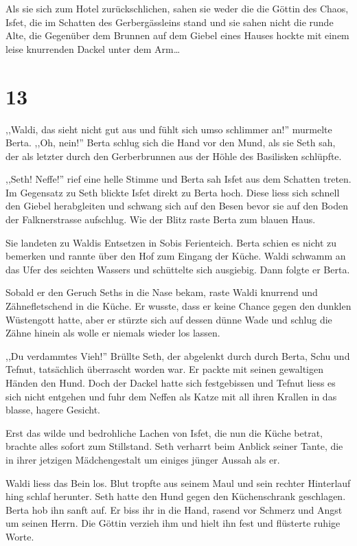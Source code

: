 Als sie sich zum Hotel zurückschlichen, sahen sie weder die die Göttin des Chaos, Isfet, die im Schatten des Gerbergässleins stand und sie sahen nicht die runde Alte, die Gegenüber dem Brunnen auf dem Giebel eines Hauses hockte mit einem leise knurrenden Dackel unter dem Arm\dots

\section*{13}

,,Waldi, das sieht nicht gut aus und fühlt sich umso schlimmer an!'' murmelte Berta. ,,Oh, nein!'' Berta schlug sich die Hand vor den Mund, als sie Seth sah, der als letzter durch den Gerberbrunnen aus der Höhle des Basilisken schlüpfte. 

,,Seth! Neffe!'' rief eine helle Stimme und Berta sah Isfet aus dem Schatten treten. Im Gegensatz zu Seth blickte Isfet direkt zu Berta hoch. Diese liess sich schnell den Giebel herabgleiten und schwang sich auf den Besen bevor sie auf den Boden der Falknerstrasse aufschlug. Wie der Blitz raste Berta zum blauen Haus.

Sie landeten zu Waldis Entsetzen in Sobis Ferienteich. Berta schien es nicht zu bemerken und rannte über den Hof zum Eingang der Küche. Waldi schwamm an das Ufer des seichten Wassers und schüttelte sich ausgiebig. Dann folgte er Berta.

Sobald er den Geruch Seths in die Nase bekam, raste Waldi knurrend und Zähnefletschend in die Küche. Er wusste, dass er keine Chance gegen den dunklen Wüstengott hatte, aber er stürzte sich auf dessen dünne Wade und schlug die Zähne hinein als wolle er niemals wieder los lassen.

,,Du verdammtes Vieh!'' Brüllte Seth, der abgelenkt durch durch Berta, Schu und Tefnut, tatsächlich überrascht worden war. Er packte mit seinen gewaltigen Händen den Hund. Doch der Dackel hatte sich festgebissen und Tefnut liess es sich nicht entgehen und fuhr dem Neffen als  Katze mit all ihren Krallen in das blasse, hagere Gesicht.

Erst das wilde und bedrohliche Lachen von Isfet, die nun die Küche betrat, brachte alles sofort zum Stillstand. Seth verharrt beim Anblick seiner Tante, die in ihrer jetzigen Mädchengestalt um einiges jünger Aussah als er.

Waldi liess das Bein los. Blut tropfte aus seinem Maul und sein rechter Hinterlauf hing schlaf herunter. Seth hatte den Hund gegen den Küchenschrank geschlagen. Berta hob ihn sanft auf. Er biss ihr in die Hand, rasend vor Schmerz und Angst um seinen Herrn. Die Göttin verzieh ihm und hielt ihn fest und flüsterte ruhige Worte.

